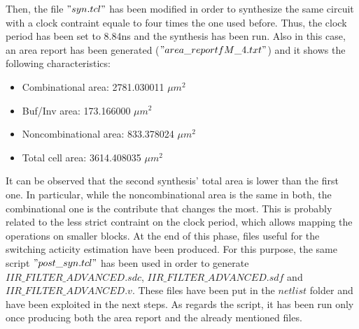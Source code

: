 Then, the file $"syn.tcl"$ has been modified in order to synthesize the same circuit with a clock contraint equale to four times the one used before. Thus, the clock period has been set to 8.84\si{\nano\second} and the synthesis has been run. Also in this case, an area report has been generated ($"area\_reportfM\_4.txt"$) and it shows the following characteristics:

\begin{itemize}
\item Combinational area:               2781.030011 $\mu m^{2}$
\item Buf/Inv area:                      173.166000 $\mu m^{2}$
\item Noncombinational area:             833.378024 $\mu m^{2}$
\item Total cell area:                  3614.408035 $\mu m^{2}$
\end{itemize}

It can be observed that the second synthesis' total area is lower than the first one. In particular, while the noncombinational area is the same in both, the combinational one is the contribute that changes the most. This is probably related to the less strict contraint on the clock period, which allows mapping the operations on smaller blocks.
\newline
\newline
At the end of this phase, files useful for the switching acticity estimation have been produced. For this purpose, the same script $"post\_syn.tcl"$ has been used in order to generate $IIR\_FILTER\_ADVANCED.sdc$, $IIR\_FILTER\_ADVANCED.sdf$ and $IIR\_FILTER\_ADVANCED.v$. These files have been put in the $netlist$ folder and have been exploited in the next steps. As regards the script, it has been run only once producing both the area report and the already mentioned files.
